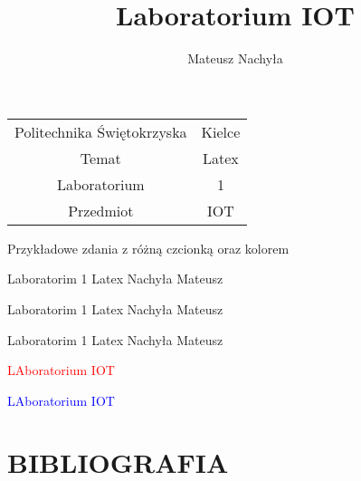 \documentclass[10pt,a4paper]{article}
\author{Mateusz Nachyła}
\title{Laboratorium IOT}
\begin{document}
\maketitle
\begin{center}
\begin{tabular}{|c|c|} \hline
Politechnika Świętokrzyska & Kielce \\
Temat & Latex \\
Laboratorium & 1 \\
\hline \hline
Przedmiot & IOT \\ \hline
\end{tabular}
\end{center}

\begin{center}

{\Huge Przykładowe zdania z różną czcionką oraz kolorem \\}

\begin{tiny}
Laboratorim 1 Latex Nachyła Mateusz\\
\end{tiny}

\begin{footnotesize}
Laboratorim 1 Latex Nachyła Mateusz\\
\end{footnotesize}

\begin{Large}
Laboratorim 1 Latex Nachyła Mateusz\\
\end{Large}

\begin{Large}
\textcolor{red}{LAboratorium IOT}\\
\end{Large}

\begin{huge}
\textcolor{blue}{LAboratorium IOT}\\
\end{huge}

\pagecolor{yellow}
\section{BIBLIOGRAFIA}
\end{center}





\cite{wiki:latex}


\end{document}
